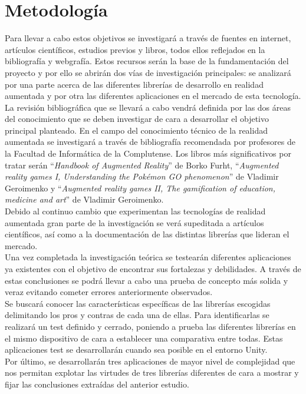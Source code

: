 \section{Metodología}
Para llevar a cabo estos objetivos se investigará a través de fuentes en internet, artículos científicos, estudios previos y libros, todos ellos reflejados en la bibliografía y webgrafía. Estos recursos serán la base de la fundamentación del proyecto y por ello se abrirán dos vías de investigación principales: se analizará por una parte acerca de las diferentes librerías de desarrollo en realidad aumentada y por otra las diferentes aplicaciones en el mercado de esta tecnología.\\

La revisión bibliográfica que se llevará a cabo vendrá definida por las dos áreas del conocimiento que se deben investigar de cara a desarrollar el objetivo principal planteado. En el campo del conocimiento técnico de la realidad aumentada se investigará a través de bibliografía recomendada por profesores de la Facultad de Informática de la Complutense. Los libros más significativos por tratar serán “\textit{Handbook of Augmented Reality}” de Borko Furht, “\textit{Augmented reality games I, Understanding the Pokémon GO phenomenon}” de Vladimir Geroimenko y “\textit{Augmented reality games II, The gamification of education, medicine and art}” de Vladimir Geroimenko.\\

Debido al continuo cambio que experimentan las tecnologías de realidad aumentada gran parte de la investigación se verá supeditada a artículos científicos, así como a la documentación de las distintas librerías que lideran el mercado.\\

Una vez completada la investigación teórica se testearán diferentes aplicaciones ya existentes con el objetivo de encontrar sus fortalezas y debilidades. A través de estas conclusiones se podrá llevar a cabo una prueba de concepto más solida y veraz evitando cometer errores anteriormente observados.\\
Se buscará conocer las características específicas de las librerías escogidas delimitando los pros y contras de cada una de ellas. Para identificarlas se realizará un test definido y cerrado, poniendo a prueba las diferentes librerías en el mismo dispositivo de cara a establecer una comparativa entre todas. Estas aplicaciones test se desarrollarán cuando sea posible en el entorno Unity.\\
Por último, se desarrollarán tres aplicaciones de mayor nivel de complejidad que nos permitan explotar las virtudes de tres librerías diferentes de cara a mostrar y fijar las conclusiones extraídas del anterior estudio.\\

